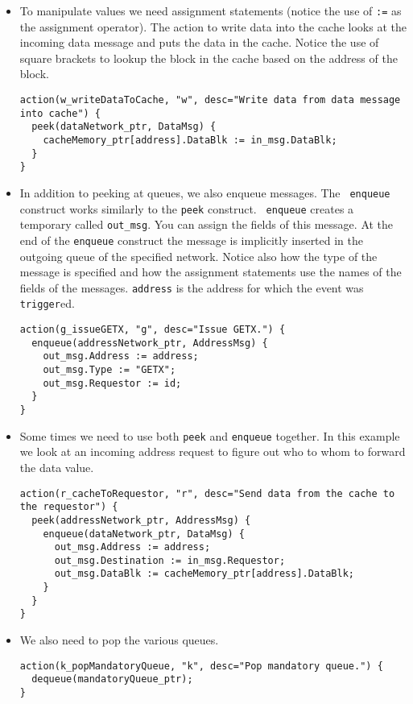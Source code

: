\documentclass[11pt]{article}
\begin{document}
\begin{itemize}

\item 
To manipulate values we need assignment statements (notice the use of
{\verb+:=+} as the assignment operator).  The action to write data
into the cache looks at the incoming data message and puts the data in
the cache.  Notice the use of square brackets to lookup the block in
the cache based on the address of the block.

\begin{verbatim}
action(w_writeDataToCache, "w", desc="Write data from data message into cache") {
  peek(dataNetwork_ptr, DataMsg) {
    cacheMemory_ptr[address].DataBlk := in_msg.DataBlk;
  }
}
\end{verbatim}

\item 
In addition to peeking at queues, we also enqueue messages.  The {\tt
enqueue} construct works similarly to the {\tt peek} construct.  {\tt
enqueue} creates a temporary called {\tt out\_msg}.  You can assign
the fields of this message.  At the end of the {\tt enqueue} construct
the message is implicitly inserted in the outgoing queue of the
specified network.  Notice also how the type of the message is
specified and how the assignment statements use the names of the
fields of the messages.  {\tt address} is the address for which the
event was {\tt trigger}ed.

\begin{verbatim}
action(g_issueGETX, "g", desc="Issue GETX.") {
  enqueue(addressNetwork_ptr, AddressMsg) {
    out_msg.Address := address;
    out_msg.Type := "GETX";
    out_msg.Requestor := id;
  }
}
\end{verbatim}

\item 
Some times we need to use both {\tt peek} and {\tt enqueue} together.
In this example we look at an incoming address request to figure out
who to whom to forward the data value.

\begin{verbatim}
action(r_cacheToRequestor, "r", desc="Send data from the cache to the requestor") {
  peek(addressNetwork_ptr, AddressMsg) {
    enqueue(dataNetwork_ptr, DataMsg) {
      out_msg.Address := address;
      out_msg.Destination := in_msg.Requestor;
      out_msg.DataBlk := cacheMemory_ptr[address].DataBlk;
    }
  }
}
\end{verbatim}

\item 
We also need to pop the various queues.
\begin{verbatim}
action(k_popMandatoryQueue, "k", desc="Pop mandatory queue.") {
  dequeue(mandatoryQueue_ptr);
}
\end{verbatim}


\end{itemize}
\end{document}
